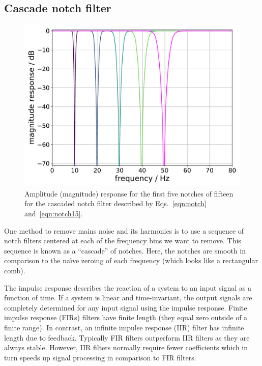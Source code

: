 \documentclass[aps,pra,superscriptaddress,reprint,nofootinbib]{revtex4-1}
\begin{document}
\subsection{Cascade notch filter}

\label{sec:notch}
\begin{figure}
\begin{center}
\includegraphics[width=.45\textwidth]{figures/cascaded_notch_response_plot.pdf}
\end{center}
\caption{\label{fig:notchMagResponse}
Amplitude (magnitude) response for the first five notches of fifteen for the cascaded notch filter described by Eqs.~\ref{eqn:notch} and~\ref{eqn:notch15}. 
}
\end{figure}

One method to remove mains noise and its harmonics is to use a sequence of notch filters centered at each of the frequency bins we want to remove. This sequence is known as a ``cascade'' of notches. Here, the notches are smooth in comparison to the na{\"i}ve zeroing of each frequency (which looks like a rectangular comb). 

The impulse response describes the reaction of a system to an input signal as a function of time. 
If a system is linear and time-invariant, the output signals are completely determined for any input signal using the impulse response. 
Finite impulse response (FIRs) filters have finite length (they equal zero outside of a finite range). 
In contrast, an infinite impulse response (IIR) filter has infinite length due to feedback. 
Typically FIR filters outperform IIR filters as they are always stable. 
However, IIR filters normally require fewer coefficients which in turn speeds up signal processing in comparison to FIR filters. 
\end{document}

